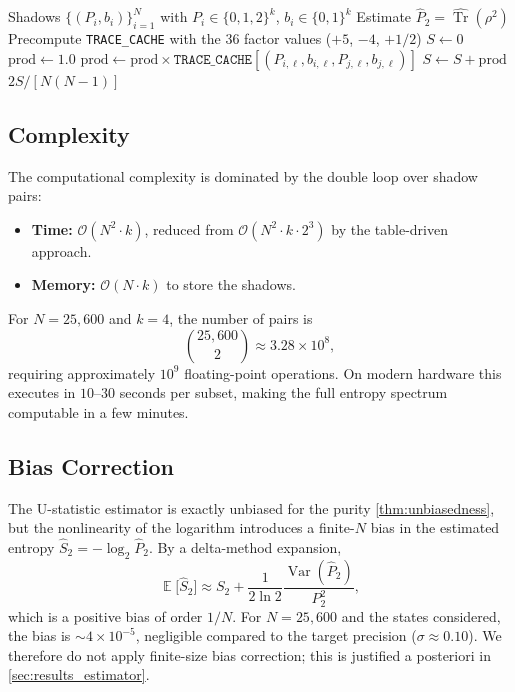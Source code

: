 \documentclass[12pt,a4paper,oneside]{book}
\theoremstyle{plain}
\theoremstyle{definition}
\theoremstyle{remark}
\DeclareMathOperator{\Var}{Var}
\DeclareMathOperator{\E}{\mathbb{E}}
\begin{document}
\begin{algorithm}[H]
\caption{Purity estimator with TRACE\_CACHE}\label{alg:estimator}
\begin{algorithmic}[1]
\Require Shadows $\{(P_i, b_i)\}_{i=1}^{N}$ with $P_i \in \{0,1,2\}^{k}$, $b_i \in \{0,1\}^{k}$
\Ensure Estimate $\widehat{P}_2 = \widehat{\operatorname{Tr}}(\rho^2)$
\State Precompute \texttt{TRACE\_CACHE} with the 36 factor values ($+5$, $-4$, $+1/2$)
\State $S \gets 0$
        \State $\text{prod} \gets 1.0$
            \State $\text{prod} \gets \text{prod} \times \texttt{TRACE\_CACHE}[(P_{i,\ell}, b_{i,\ell}, P_{j,\ell}, b_{j,\ell})]$
        \EndFor
        \State $S \gets S + \text{prod}$
    \EndFor
\EndFor
\State \Return $2S / [N(N-1)]$
\end{algorithmic}
\end{algorithm}

\subsection{Complexity}

The computational complexity is dominated by the double loop over shadow pairs:
\begin{itemize}[itemsep=2pt]
    \item \textbf{Time:} $\mathcal{O}(N^2 \cdot k)$, reduced from $\mathcal{O}(N^2 \cdot k \cdot 2^3)$ by the table-driven approach.
    \item \textbf{Memory:} $\mathcal{O}(N \cdot k)$ to store the shadows.
\end{itemize}

For $N = 25{,}600$ and $k = 4$, the number of pairs is
\begin{equation}
    \binom{25{,}600}{2} \approx 3.28 \times 10^8,
\end{equation}
requiring approximately $10^9$ floating-point operations. On modern hardware this executes in $10$--$30$ seconds per subset, making the full entropy spectrum computable in a few minutes.

\subsection{Bias Correction}

The U-statistic estimator is exactly unbiased for the purity \cref{thm:unbiasedness}, but the nonlinearity of the logarithm introduces a finite-$N$ bias in the estimated entropy $\widehat{S}_2 = -\log_2 \widehat{P}_2$. By a delta-method expansion,
\begin{equation}
    \E\bigl[\widehat{S}_2\bigr] \approx S_2 + \frac{1}{2 \ln 2} \frac{\Var(\widehat{P}_2)}{P_2^2},
\end{equation}
which is a positive bias of order $1/N$. For $N = 25{,}600$ and the states considered, the bias is $\sim 4 \times 10^{-5}$, negligible compared to the target precision ($\sigma \approx 0.10$). We therefore do not apply finite-size bias correction; this is justified a posteriori in \cref{sec:results_estimator}.
\end{document}
